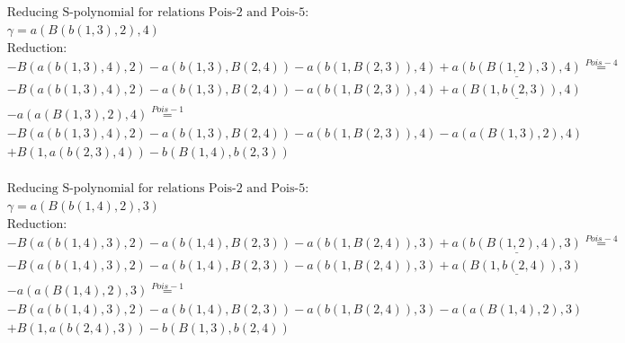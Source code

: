 \documentclass[11pt]{amsart}
\begin{document}
\begin{align*} 
& \text{Reducing S-polynomial for relations Pois-2 and Pois-5:} \\ 
& \gamma = a(B(b(1,3),2),4) \\ 
& \text{Reduction}: \\& - B(a(b(1,3),4),2) - a(b(1,3),B(2,4)) - a(b(1,B(2,3)),4) + \underline{a(b(B(1,2),3),4)} \stackrel{ Pois-4 }{=}  \\ 
& - B(a(b(1,3),4),2) - a(b(1,3),B(2,4)) - a(b(1,B(2,3)),4) + \underline{a(B(1,b(2,3)),4)}\\ 
 &  - a(a(B(1,3),2),4) \stackrel{ Pois-1 }{=}  \\ 
& - B(a(b(1,3),4),2) - a(b(1,3),B(2,4)) - a(b(1,B(2,3)),4) - a(a(B(1,3),2),4)\\ 
 &  + B(1,a(b(2,3),4)) - b(B(1,4),b(2,3))\\ 
\end{align*} 
 
\begin{align*} 
& \text{Reducing S-polynomial for relations Pois-2 and Pois-5:} \\ 
& \gamma = a(B(b(1,4),2),3) \\ 
& \text{Reduction}: \\& - B(a(b(1,4),3),2) - a(b(1,4),B(2,3)) - a(b(1,B(2,4)),3) + \underline{a(b(B(1,2),4),3)} \stackrel{ Pois-4 }{=}  \\ 
& - B(a(b(1,4),3),2) - a(b(1,4),B(2,3)) - a(b(1,B(2,4)),3) + \underline{a(B(1,b(2,4)),3)}\\ 
 &  - a(a(B(1,4),2),3) \stackrel{ Pois-1 }{=}  \\ 
& - B(a(b(1,4),3),2) - a(b(1,4),B(2,3)) - a(b(1,B(2,4)),3) - a(a(B(1,4),2),3)\\ 
 &  + B(1,a(b(2,4),3)) - b(B(1,3),b(2,4))\\ 
\end{align*} 
 
\end{document}
